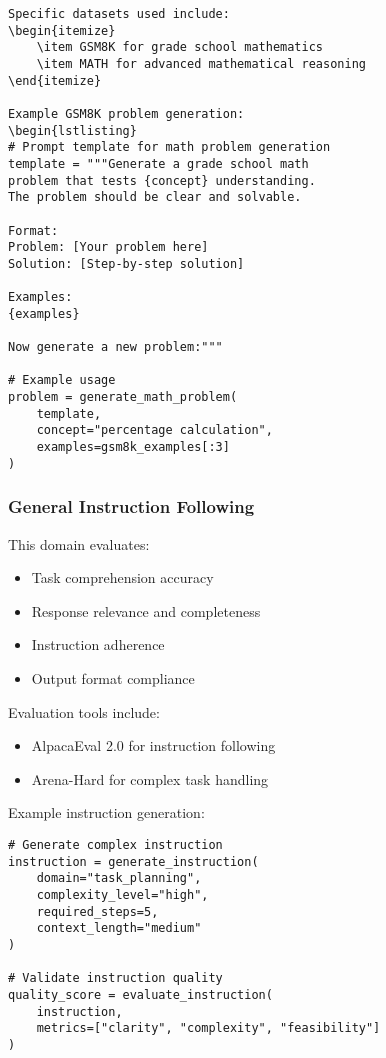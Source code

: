 \documentclass[10pt,conference]{IEEEtran}
\begin{document}
\begin{lstlisting}
Specific datasets used include:
\begin{itemize}
    \item GSM8K for grade school mathematics
    \item MATH for advanced mathematical reasoning
\end{itemize}

Example GSM8K problem generation:
\begin{lstlisting}
# Prompt template for math problem generation
template = """Generate a grade school math 
problem that tests {concept} understanding.
The problem should be clear and solvable.

Format:
Problem: [Your problem here]
Solution: [Step-by-step solution]

Examples:
{examples}

Now generate a new problem:"""

# Example usage
problem = generate_math_problem(
    template,
    concept="percentage calculation",
    examples=gsm8k_examples[:3]
)
\end{lstlisting}

\subsubsection{General Instruction Following}
This domain evaluates:
\begin{itemize}
    \item Task comprehension accuracy
    \item Response relevance and completeness
    \item Instruction adherence
    \item Output format compliance
\end{itemize}

Evaluation tools include:
\begin{itemize}
    \item AlpacaEval 2.0 for instruction following
    \item Arena-Hard for complex task handling
\end{itemize}

Example instruction generation:
\begin{lstlisting}
# Generate complex instruction
instruction = generate_instruction(
    domain="task_planning",
    complexity_level="high",
    required_steps=5,
    context_length="medium"
)

# Validate instruction quality
quality_score = evaluate_instruction(
    instruction,
    metrics=["clarity", "complexity", "feasibility"]
)
\end{lstlisting}
\end{document}
